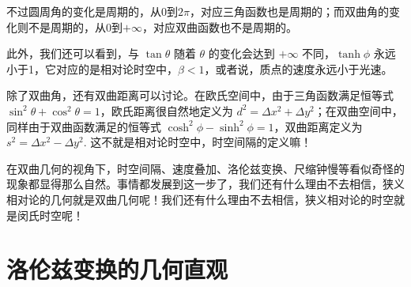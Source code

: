 \documentclass[12pt, a4paper, oneside]{ctexbook}
\begin{document}
不过圆周角的变化是周期的，从0到$2\pi$，对应三角函数也是周期的；而双曲角的变化则不是周期的，从0到$+\infty$，对应双曲函数也不是周期的。\par   
此外，我们还可以看到，与 $\tan\theta$ 随着 $\theta$ 的变化会达到 $+\infty$ 不同，$\tanh\phi$ 永远小于1，它对应的是相对论时空中，$\beta<1$，或者说，质点的速度永远小于光速。\par   
除了双曲角，还有双曲距离可以讨论。在欧氏空间中，由于三角函数满足恒等式 $\sin^{2}\theta+\cos^{2}\theta=1$，欧氏距离很自然地定义为 $d^{2}=\Delta x^{2}+\Delta y^{2}$；在双曲空间中，同样由于双曲函数满足的恒等式 $\cosh^{2}\phi-\sinh^{2}\phi=1$，双曲距离定义为 $s^{2}=\Delta x^{2}-\Delta y^{2}$. 这不就是相对论时空中，时空间隔的定义嘛！\par   
在双曲几何的视角下，时空间隔、速度叠加、洛伦兹变换、尺缩钟慢等看似奇怪的现象都显得那么自然。事情都发展到这一步了，我们还有什么理由不去相信，狭义相对论的几何就是双曲几何呢！我们还有什么理由不去相信，狭义相对论的时空就是闵氏时空呢！\par   


\section{洛伦兹变换的几何直观}
\end{document}
